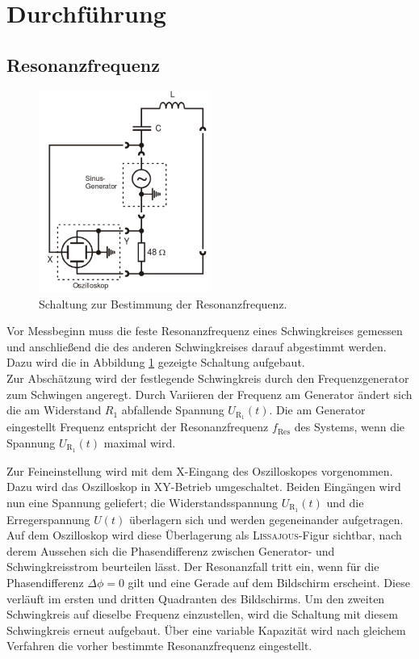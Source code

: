 \section{Durchführung}
\label{sec:Durchfuehrung}
\subsection{Resonanzfrequenz}
\label{sec:Resonanzfrequenz}
\begin{figure}[h]
	\centering
		\includegraphics[width=0.5\textwidth]{Bilder/Resonanzfrequenz.pdf}
		\caption{Schaltung zur Bestimmung der Resonanzfrequenz. \cite{v355}} 
\label{fig:resonanzfrequenz}
\end{figure}
Vor Messbeginn muss die feste Resonanzfrequenz eines Schwingkreises gemessen und anschließend die des anderen Schwingkreises darauf abgestimmt werden. 
Dazu wird die in Abbildung \ref{fig:resonanzfrequenz} gezeigte Schaltung aufgebaut. \\
Zur Abschätzung wird der festlegende Schwingkreis durch den Frequenzgenerator zum Schwingen angeregt. 
Durch Variieren der Frequenz am Generator ändert sich die am Widerstand $R_1$ abfallende Spannung $U_\mathup{R_1}(t)$. 
Die am Generator eingestellt Frequenz entspricht der Resonanzfrequenz $f_\mathup{Res}$ des Systems, wenn die Spannung $U_\mathup{R_1}(t)$ maximal wird.

Zur Feineinstellung wird mit dem X-Eingang des Oszilloskopes vorgenommen.
Dazu wird das Oszilloskop in XY-Betrieb umgeschaltet. 
Beiden Eingängen wird nun eine Spannung geliefert; 
die Widerstandsspannung $U_\mathup{R_1}(t)$ und die Erregerspannung $U(t)$ überlagern sich und werden gegeneinander aufgetragen. 
Auf dem Oszilloskop wird diese Überlagerung als \textsc{Lissajous}-Figur sichtbar, nach derem Aussehen sich die Phasendifferenz zwischen Generator- und Schwingkreisstrom beurteilen lässt. 
Der Resonanzfall tritt ein, wenn für die Phasendifferenz $\Delta{\phi}=0$  gilt und eine Gerade auf dem Bildschirm erscheint. 
Diese verläuft im ersten und dritten Quadranten des Bildschirms.
Um den zweiten Schwingkreis auf dieselbe Frequenz einzustellen, wird die Schaltung mit diesem Schwingkreis erneut aufgebaut. 
Über eine variable Kapazität wird nach gleichem Verfahren die vorher bestimmte Resonanzfrequenz eingestellt.

